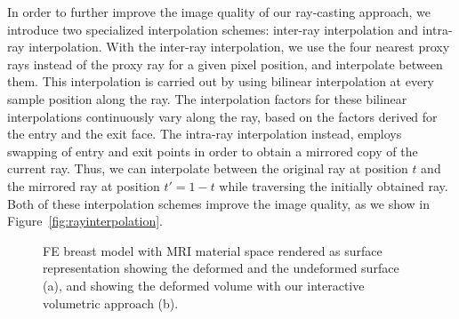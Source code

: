 \documentclass[review,journal]{vgtc}         %
\begin{document}
In order to further improve the image quality of our ray-casting approach, we introduce two specialized interpolation schemes: inter-ray interpolation and intra-ray interpolation. With the inter-ray interpolation, we use the four nearest proxy rays  instead of the proxy ray for a given pixel position, and interpolate between them. This interpolation is carried out by using bilinear interpolation at every sample position along the ray. The interpolation factors for these bilinear interpolations continuously vary along the ray, based on the factors derived for the entry and the exit face. The intra-ray interpolation instead, employs swapping of entry and exit points in order to obtain a mirrored copy of the current ray. Thus, we can interpolate between the original ray at position $t$ and the mirrored ray at position $t'=1-t$ while traversing the initially obtained ray. Both of these interpolation schemes improve the image quality, as we show in Figure~\ref{fig:rayinterpolation}.

\begin{figure}
    \centering 
    \caption{FE breast model with MRI material space rendered as surface representation showing the deformed and the undeformed surface (a), and showing the deformed volume with our interactive volumetric approach (b).}
    \label{fig:breast}
\end{figure}
\end{document}
